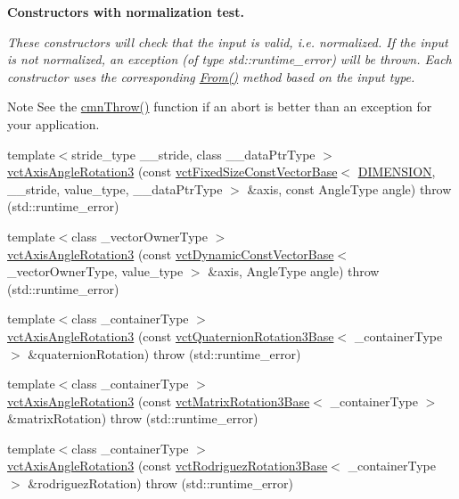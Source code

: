 \begin{Indent}{\bf Constructors with normalization test.}\par
{\em These constructors will check that the input is valid, i.\+e. normalized. If the input is not normalized, an exception (of type {\ttfamily std\+::runtime\+\_\+error}) will be thrown. Each constructor uses the corresponding \hyperlink{classvct_axis_angle_rotation3_a296f32cc8359a9b986f1d15dd1834aa0}{From()} method based on the input type.

\begin{DoxyNote}{Note}
See the \hyperlink{_minimal_cmn_8h_ad50e82cf9c9dbd0e6443c13e0d1a6f1a}{cmn\+Throw()} function if an {\ttfamily abort} is better than an exception for your application. 
\end{DoxyNote}
}\begin{DoxyCompactItemize}
\item 
{\footnotesize template$<$stride\+\_\+type \+\_\+\+\_\+stride, class \+\_\+\+\_\+data\+Ptr\+Type $>$ }\\\hyperlink{classvct_axis_angle_rotation3_ada2d924fbd3a153056a59386780f3131}{vct\+Axis\+Angle\+Rotation3} (const \hyperlink{classvct_fixed_size_const_vector_base}{vct\+Fixed\+Size\+Const\+Vector\+Base}$<$ \hyperlink{group__cisst_vector_gga278b4a98a62e4f5ff42ce055836240a9a778d22dfe29402d2cfdd381c1b870285}{D\+I\+M\+E\+N\+S\+I\+O\+N}, \+\_\+\+\_\+stride, value\+\_\+type, \+\_\+\+\_\+data\+Ptr\+Type $>$ \&axis, const Angle\+Type angle)  throw (std\+::runtime\+\_\+error)
\item 
{\footnotesize template$<$class \+\_\+vector\+Owner\+Type $>$ }\\\hyperlink{classvct_axis_angle_rotation3_aaca2918591b9722203a8fcdf793e6abe}{vct\+Axis\+Angle\+Rotation3} (const \hyperlink{classvct_dynamic_const_vector_base}{vct\+Dynamic\+Const\+Vector\+Base}$<$ \+\_\+vector\+Owner\+Type, value\+\_\+type $>$ \&axis, Angle\+Type angle)  throw (std\+::runtime\+\_\+error)
\item 
{\footnotesize template$<$class \+\_\+container\+Type $>$ }\\\hyperlink{classvct_axis_angle_rotation3_a04fa3bc0de3bcbb8399125d1509008d0}{vct\+Axis\+Angle\+Rotation3} (const \hyperlink{classvct_quaternion_rotation3_base}{vct\+Quaternion\+Rotation3\+Base}$<$ \+\_\+container\+Type $>$ \&quaternion\+Rotation)  throw (std\+::runtime\+\_\+error)
\item 
{\footnotesize template$<$class \+\_\+container\+Type $>$ }\\\hyperlink{classvct_axis_angle_rotation3_ae5f8d6b81b3784ebb1ee58ec7f5bca27}{vct\+Axis\+Angle\+Rotation3} (const \hyperlink{classvct_matrix_rotation3_base}{vct\+Matrix\+Rotation3\+Base}$<$ \+\_\+container\+Type $>$ \&matrix\+Rotation)  throw (std\+::runtime\+\_\+error)
\item 
{\footnotesize template$<$class \+\_\+container\+Type $>$ }\\\hyperlink{classvct_axis_angle_rotation3_a38b21663c016386d0b5a961a23b98b04}{vct\+Axis\+Angle\+Rotation3} (const \hyperlink{classvct_rodriguez_rotation3_base}{vct\+Rodriguez\+Rotation3\+Base}$<$ \+\_\+container\+Type $>$ \&rodriguez\+Rotation)  throw (std\+::runtime\+\_\+error)
\end{DoxyCompactItemize}
\end{Indent}
